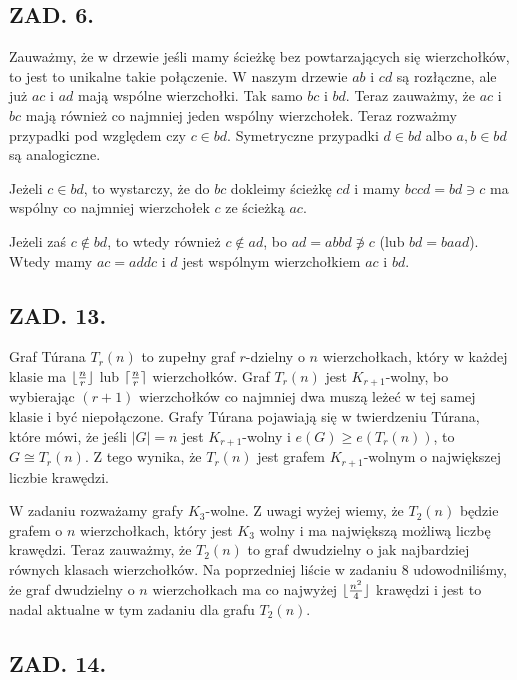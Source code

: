 \documentclass{article}
\begin{document}
\subsection*{ZAD. 6.}

Zauważmy, że w drzewie jeśli mamy ścieżkę bez powtarzających się wierzchołków, to jest to unikalne takie połączenie. W naszym drzewie $ab$ i $cd$ są rozłączne, ale już $ac$ i $ad$ mają wspólne wierzchołki. Tak samo $bc$ i $bd$. Teraz zauważmy, że $ac$ i $bc$ mają również co najmniej jeden wspólny wierzchołek. Teraz rozważmy przypadki pod względem czy $c\in bd$. Symetryczne przypadki $d\in bd$ albo $a,b\in bd$ są analogiczne.

Jeżeli $c\in bd$, to wystarczy, że do $bc$ dokleimy ścieżkę $cd$ i mamy $bccd=bd\ni c$ ma wspólny co najmniej wierzchołek $c$ ze ścieżką $ac$. 

Jeżeli zaś $c\notin bd$, to wtedy również $c\notin ad$, bo $ad=abbd\not\ni c$ (lub $bd=baad$). Wtedy mamy $ac=addc$ i $d$ jest wspólnym wierzchołkiem $ac$ i $bd$.

\subsection*{ZAD. 13.}

Graf T\'urana $T_r(n)$ to zupełny graf $r$-dzielny o $n$ wierzchołkach, który w każdej klasie ma $\lfloor {n\over r}\rfloor$ lub $\lceil {n\over r}\rceil$ wierzchołków. Graf $T_r(n)$ jest $K_{r+1}$-wolny, bo wybierając $(r+1)$ wierzchołków co najmniej dwa muszą leżeć w tej samej klasie i być niepołączone. Grafy T\'urana pojawiają się w {\color{acc}twierdzeniu T\'urana}, które mówi, że jeśli $|G|=n$ jest $K_{r+1}$-wolny i $e(G)\geq e(T_r(n))$, to $G\cong T_r(n)$. Z tego wynika, że $T_r(n)$ jest grafem $K_{r+1}$-wolnym o największej liczbie krawędzi.
\medskip

W zadaniu rozważamy grafy $K_3$-wolne. Z uwagi wyżej wiemy, że $T_2(n)$ będzie grafem o $n$ wierzchołkach, który jest $K_3$ wolny i ma największą możliwą liczbę krawędzi. Teraz zauważmy, że $T_2(n)$ to graf dwudzielny o jak najbardziej równych klasach wierzchołków. Na poprzedniej liście w zadaniu 8 udowodniliśmy, że graf dwudzielny o $n$ wierzchołkach ma co najwyżej $\lfloor{n^2\over 4}\rfloor$ krawędzi i jest to nadal aktualne w tym zadaniu dla grafu $T_2(n)$.

\subsection*{ZAD. 14.}
\end{document}
